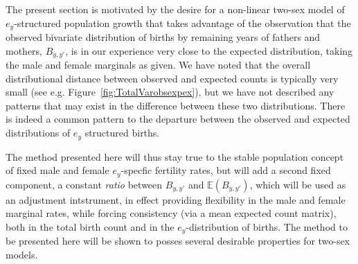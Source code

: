
The present section is motivated by the desire for a non-linear two-sex model of
$e_y$-structured population growth that takes advantage of the observation that
the observed bivariate distribution of births by remaining years of fathers 
and mothers, $B_{y,y'}$, is in our experience very close to the expected
distribution, taking the male and female marginals as given. We have noted 
that the overall distributional distance
between observed and expected counts is typically very small (see e.g.
Figure~\ref{fig:TotalVarobsexpex}), but we have not described any patterns that
may exist in the difference between these two distributions. There is indeed a
common pattern to the departure between the observed and expected distributions
of $e_y$ structured births.  

The method presented here will thus stay true to the stable population concept
 of fixed male and female $e_y$-specfic fertility rates, but will add a second
 fixed component, a constant \textit{ratio} between $B_{y,y'}$ and
 $\mathbb{E}(B_{y,y'})$, which will be used as an adjustment intstrument, in
 effect providing flexibility in the male and female marginal rates, while forcing
 consistency (via a mean expected count matrix), both in the total birth count
 and in the $e_y$-distribution of births. The method to be presented here will be shown to posses
 several desirable properties for two-sex models.
 
 



